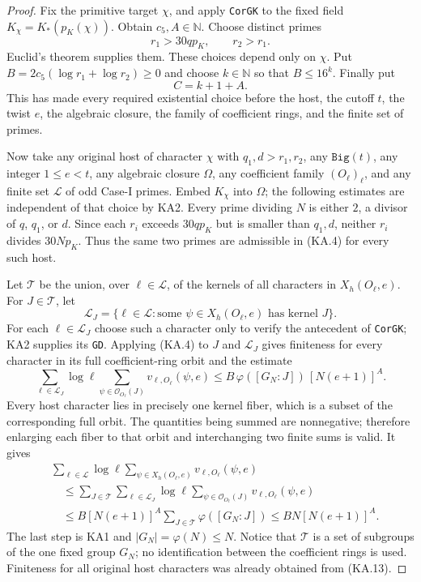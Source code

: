 \begin{proof}
Fix the primitive target $\chi$, and apply \texttt{CorGK} to
the fixed field $K_\chi=K_*(p_K(\chi))$.  Obtain $c_5,A\in\mathbb N$.
Choose distinct primes
\[
       r_1>30qp_K,\qquad r_2>r_1.
 \tag{KA.10}
\]
Euclid's theorem supplies them.  These choices depend only on
$\chi$.  Put $B=2c_5(\log r_1+\log r_2)\ge0$ and choose
$k\in\mathbb N$ so that $B\le16^k$.  Finally put
\[
                    C=k+1+A.
 \tag{KA.11}
\]
This has made every required existential choice before the host,
the cutoff $t$, the twist $e$, the algebraic closure, the family of
coefficient rings, and the finite set of primes.

Now take any original host of character $\chi$ with
$q_1,d>r_1,r_2$, any $\texttt{Big}(t)$, any integer
$1\le e<t$, any algebraic closure $\Omega$, any coefficient
family $(O_\ell)_\ell$, and any finite set $\mathcal L$ of odd
Case-I primes.  Embed $K_\chi$ into $\Omega$; the following
estimates are independent of that choice by KA2.
Every prime dividing $N$ is either $2$, a divisor of $q$,
$q_1$, or $d$.  Since each $r_i$ exceeds $30qp_K$ but is smaller
than $q_1,d$, neither $r_i$ divides $30Np_K$.  Thus the same two
primes are admissible in (KA.4) for every such host.

Let $\mathcal T$ be the union, over $\ell\in\mathcal L$, of
the kernels of all characters in $X_h(O_\ell,e)$.  For
$J\in\mathcal T$, let
\[
 \mathcal L_J=\{\ell\in\mathcal L:
     \text{some }\psi\in X_h(O_\ell,e)\text{ has kernel }J\}.
 \tag{KA.12}
\]
For each $\ell\in\mathcal L_J$ choose such a character only to
verify the antecedent of \texttt{CorGK}; KA2 supplies its
\texttt{GD}.  Applying (KA.4) to $J$ and $\mathcal L_J$ gives
finiteness for every character in its full coefficient-ring orbit
and the estimate
\[
 \sum_{\ell\in\mathcal L_J}\log\ell
       \sum_{\psi\in\mathcal O_{O_\ell}(J)}v_{\ell,O_\ell}(\psi,e)
       \le B\,\varphi([G_N:J])\,[N(e+1)]^A.
 \tag{KA.13}
\]
Every host character lies in precisely one kernel fiber, which is
a subset of the corresponding full orbit.  The quantities being
summed are nonnegative; therefore enlarging each fiber to that
orbit and interchanging two finite sums is valid.  It gives
\begin{align*}
 &\sum_{\ell\in\mathcal L}\log\ell
                   \sum_{\psi\in X_h(O_\ell,e)}v_{\ell,O_\ell}(\psi,e)\\
 &\quad\le\sum_{J\in\mathcal T}
       \sum_{\ell\in\mathcal L_J}\log\ell
                   \sum_{\psi\in\mathcal O_{O_\ell}(J)}v_{\ell,O_\ell}(\psi,e)\\
 &\quad\le B[N(e+1)]^A
                    \sum_{J\in\mathcal T}\varphi([G_N:J])
       \le BN[N(e+1)]^A.
 \tag{KA.14}
\end{align*}
The last step is KA1 and $|G_N|=\varphi(N)\le N$.
Notice that $\mathcal T$ is a set of subgroups of the one fixed
group $G_N$; no identification between the coefficient rings is
used.  Finiteness for all original host characters was already
obtained from (KA.13).


\end{proof}
